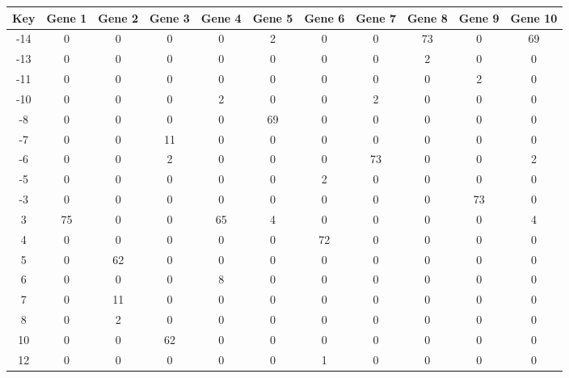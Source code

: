 \begin{tabular}{|c|c|c|c|c|c|c|c|c|c|c|}
\hline
Key & Gene 1 & Gene 2 & Gene 3 & Gene 4 & Gene 5 & Gene 6 & Gene 7 & Gene 8 & Gene 9 & Gene 10 \\
\hline
-14 & 0 & 0 & 0 & 0 & 2 & 0 & 0 & 73 & 0 & 69 \\
-13 & 0 & 0 & 0 & 0 & 0 & 0 & 0 & 2 & 0 & 0 \\
-11 & 0 & 0 & 0 & 0 & 0 & 0 & 0 & 0 & 2 & 0 \\
-10 & 0 & 0 & 0 & 2 & 0 & 0 & 2 & 0 & 0 & 0 \\
-8 & 0 & 0 & 0 & 0 & 69 & 0 & 0 & 0 & 0 & 0 \\
-7 & 0 & 0 & 11 & 0 & 0 & 0 & 0 & 0 & 0 & 0 \\
-6 & 0 & 0 & 2 & 0 & 0 & 0 & 73 & 0 & 0 & 2 \\
-5 & 0 & 0 & 0 & 0 & 0 & 2 & 0 & 0 & 0 & 0 \\
-3 & 0 & 0 & 0 & 0 & 0 & 0 & 0 & 0 & 73 & 0 \\
3 & 75 & 0 & 0 & 65 & 4 & 0 & 0 & 0 & 0 & 4 \\
4 & 0 & 0 & 0 & 0 & 0 & 72 & 0 & 0 & 0 & 0 \\
5 & 0 & 62 & 0 & 0 & 0 & 0 & 0 & 0 & 0 & 0 \\
6 & 0 & 0 & 0 & 8 & 0 & 0 & 0 & 0 & 0 & 0 \\
7 & 0 & 11 & 0 & 0 & 0 & 0 & 0 & 0 & 0 & 0 \\
8 & 0 & 2 & 0 & 0 & 0 & 0 & 0 & 0 & 0 & 0 \\
10 & 0 & 0 & 62 & 0 & 0 & 0 & 0 & 0 & 0 & 0 \\
12 & 0 & 0 & 0 & 0 & 0 & 1 & 0 & 0 & 0 & 0 \\
\hline
\end{tabular}